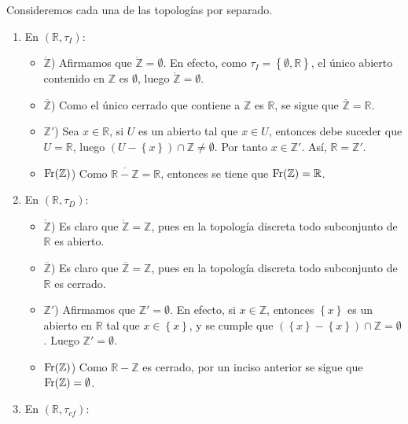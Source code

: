 \documentclass[12pt]{report}
\theoremstyle{largebreak}
\newcommand{\Int}[1]{\ensuremath{\mathring{#1}}}
\newcommand{\Cls}[1]{\ensuremath{\overline{#1}}}
\newcommand{\Fr}[1]{\ensuremath{\textup{Fr}(#1)}}
\begin{document}
    \begin{sol}
        Consideremos cada una de las topologías por separado.
        \begin{enumerate}
            \item En $(\mathbb{R},\tau_I)$:
            \begin{itemize}
                \item $\Int{\mathbb{Z}}$) Afirmamos que $\Int{\mathbb{Z}}=\emptyset$. En efecto, como $\tau_I=\left\{\emptyset,\mathbb{R} \right\}$, el único abierto contenido en $\mathbb{Z}$ es $\emptyset$, luego $\Int{\mathbb{Z}}=\emptyset$.
                \item $\Cls{\mathbb{Z}}$) Como el único cerrado que contiene a $\mathbb{Z}$ es $\mathbb{R}$, se sigue que $\Cls{\mathbb{Z}}=\mathbb{R}$.
                \item $\mathbb{Z}'$) Sea $x\in\mathbb{R}$, si $U$ es un abierto tal que $x\in U$, entonces debe suceder que $U=\mathbb{R}$, luego $(U-\left\{x\right\})\cap\mathbb{Z}\neq\emptyset$. Por tanto $x\in\mathbb{Z}'$. Así, $\mathbb{R}=\mathbb{Z}'$.
                \item $\Fr{\mathbb{Z}}$) Como $\Cls{\mathbb{R}-\mathbb{Z}}=\mathbb{R}$, entonces se tiene que $\Fr{\mathbb{Z}}=\mathbb{R}$.
            \end{itemize}
            \item En $(\mathbb{R},\tau_D)$:
            \begin{itemize}
                \item $\Int{\mathbb{Z}}$) Es claro que $\Int{\mathbb{Z}}=\mathbb{Z}$, pues en la topología discreta todo subconjunto de $\mathbb{R}$ es abierto.
                \item $\Cls{\mathbb{Z}}$) Es claro que $\Cls{\mathbb{Z}}=\mathbb{Z}$, pues en la topología discreta todo subconjunto de $\mathbb{R}$ es cerrado.
                \item $\mathbb{Z}'$) Afirmamos que $\mathbb{Z}'=\emptyset$. En efecto, si $x\in\mathbb{Z}$, entonces $\left\{x\right\}$ es un abierto en $\mathbb{R}$ tal que $x\in\left\{x\right\}$, y se cumple que $(\left\{x\right\}-\left\{x\right\})\cap \mathbb{Z}=\emptyset$. Luego $\mathbb{Z}'=\emptyset$.
                \item $\Fr{\mathbb{Z}}$) Como $\mathbb{R}-\mathbb{Z}$ es cerrado, por un inciso anterior se sigue que $\Fr{\mathbb{Z}}=\emptyset$.
            \end{itemize}
            \item En $(\mathbb{R},\tau_{cf})$:
            \begin{itemize}

\end{itemize}
\end{enumerate}
\end{sol}
\end{document}
